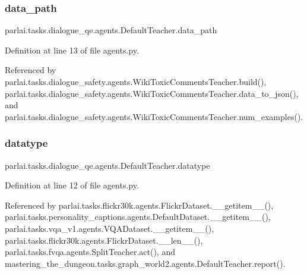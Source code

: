 \subsubsection{\texorpdfstring{data\+\_\+path}{data\_path}}
{\footnotesize\ttfamily parlai.\+tasks.\+dialogue\+\_\+qe.\+agents.\+Default\+Teacher.\+data\+\_\+path}



Definition at line 13 of file agents.\+py.



Referenced by parlai.\+tasks.\+dialogue\+\_\+safety.\+agents.\+Wiki\+Toxic\+Comments\+Teacher.\+build(), parlai.\+tasks.\+dialogue\+\_\+safety.\+agents.\+Wiki\+Toxic\+Comments\+Teacher.\+data\+\_\+to\+\_\+json(), and parlai.\+tasks.\+dialogue\+\_\+safety.\+agents.\+Wiki\+Toxic\+Comments\+Teacher.\+num\+\_\+examples().

\mbox{\label{classparlai_1_1tasks_1_1dialogue__qe_1_1agents_1_1DefaultTeacher_a8eace6f1c9861d2e153398f1e65ddcd9}} 
\subsubsection{\texorpdfstring{datatype}{datatype}}
{\footnotesize\ttfamily parlai.\+tasks.\+dialogue\+\_\+qe.\+agents.\+Default\+Teacher.\+datatype}



Definition at line 12 of file agents.\+py.



Referenced by parlai.\+tasks.\+flickr30k.\+agents.\+Flickr\+Dataset.\+\_\+\+\_\+getitem\+\_\+\+\_\+(), parlai.\+tasks.\+personality\+\_\+captions.\+agents.\+Default\+Dataset.\+\_\+\+\_\+getitem\+\_\+\+\_\+(), parlai.\+tasks.\+vqa\+\_\+v1.\+agents.\+V\+Q\+A\+Dataset.\+\_\+\+\_\+getitem\+\_\+\+\_\+(), parlai.\+tasks.\+flickr30k.\+agents.\+Flickr\+Dataset.\+\_\+\+\_\+len\+\_\+\+\_\+(), parlai.\+tasks.\+fvqa.\+agents.\+Split\+Teacher.\+act(), and mastering\+\_\+the\+\_\+dungeon.\+tasks.\+graph\+\_\+world2.\+agents.\+Default\+Teacher.\+report().

\mbox{\label{classparlai_1_1tasks_1_1dialogue__qe_1_1agents_1_1DefaultTeacher_a313b63d94f39392184547a7bc202ad7d}} 
